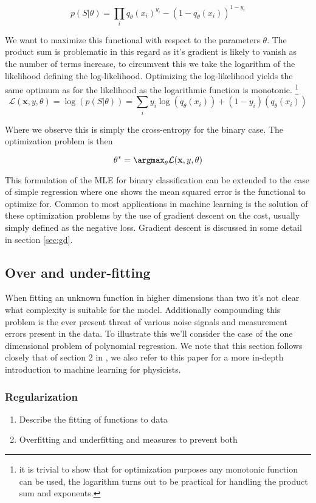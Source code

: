 \begin{equation}
p(S | \theta) = \prod_i q_\theta(x_i)^{y_i} - (1-q_\theta(x_i))^{1-y_i}
\end{equation}

\noindent We want to maximize this functional with respect to the parameters $\theta$. The product sum is problematic in this regard as it's gradient is likely to vanish as the number of terms increase, to circumvent this we take the logarithm of the likelihood defining the log-likelihood. Optimizing the log-likelihood yields the same optimum as for the likelihood as the logarithmic function is monotonic. \footnote{it is trivial to show that for optimization purposes any monotonic function can be used, the logarithm turns out to be practical for handling the product sum and exponents.}
\begin{equation}
\mathcal{L}(\mathbf{x}, y, \theta) = \log(p(S | \theta)) = \sum_i y_i\log(q_\theta(x_i)) + (1-y_i)(q_\theta(x_i))
\end{equation}

\noindent Where we observe this is simply the cross-entropy for the binary case. The optimization problem is then 

\begin{equation}
\theta^* = \argmax_\theta \mathcal{L}(\mathbf{x}, y, \theta )
\end{equation}

\noindent This formulation of the MLE for binary classification can be extended to the case of simple regression where one shows the mean squared error is the functional to optimize for. Common to most applications in machine learning is the solution of these optimization problems by the use of gradient descent on the cost, usually simply defined as the negative loss. Gradient descent is discussed in some detail in section \ref{sec:gd}.

\subsection{Over and under-fitting}

When fitting an unknown function in higher dimensions than two it's not clear what complexity is suitable for the model. Additionally compounding this problem is the ever present threat of various noise signals and measurement errors present in the data. To illustrate this we'll consider the case of the one dimensional problem of polynomial regression. We note that this section follows closely that of section 2 in \citet{Mehta2019}, we also refer to this paper for a more in-depth introduction to machine learning for physicists. 

\subsubsection*{Regularization}

\begin{enumerate}
	\item Describe the fitting of functions to data
	\item Overfitting and underfitting and measures to prevent both
\end{enumerate}